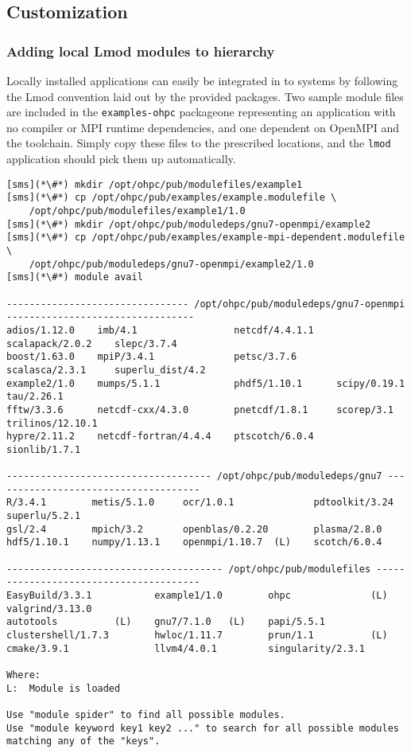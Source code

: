 \clearpage

\subsection{Customization} \label{appendix:customization}

\subsubsection{Adding local Lmod modules to \OHPC{} hierarchy} \label{appendix:modulefiles}
Locally installed applications can easily be integrated in to \OHPC{} systems by
following the Lmod convention laid out by the provided packages. Two sample
module files are included in the \texttt{examples-ohpc} package\textemdash one
representing an application with no compiler or MPI runtime dependencies, and
one dependent on OpenMPI and the \GNU{} toolchain. Simply copy these files to the
prescribed locations, and the \texttt{lmod} application should pick them up
automatically.

\begin{lstlisting}[alsoletter={/,.},morekeywords={example1/1.0, example2/1.0}]
[sms](*\#*) mkdir /opt/ohpc/pub/modulefiles/example1
[sms](*\#*) cp /opt/ohpc/pub/examples/example.modulefile \
    /opt/ohpc/pub/modulefiles/example1/1.0
[sms](*\#*) mkdir /opt/ohpc/pub/moduledeps/gnu7-openmpi/example2
[sms](*\#*) cp /opt/ohpc/pub/examples/example-mpi-dependent.modulefile \
    /opt/ohpc/pub/moduledeps/gnu7-openmpi/example2/1.0
[sms](*\#*) module avail

-------------------------------- /opt/ohpc/pub/moduledeps/gnu7-openmpi ---------------------------------
adios/1.12.0    imb/4.1                 netcdf/4.4.1.1    scalapack/2.0.2    slepc/3.7.4
boost/1.63.0    mpiP/3.4.1              petsc/3.7.6       scalasca/2.3.1     superlu_dist/4.2
example2/1.0    mumps/5.1.1             phdf5/1.10.1      scipy/0.19.1       tau/2.26.1
fftw/3.3.6      netcdf-cxx/4.3.0        pnetcdf/1.8.1     scorep/3.1         trilinos/12.10.1
hypre/2.11.2    netcdf-fortran/4.4.4    ptscotch/6.0.4    sionlib/1.7.1

------------------------------------ /opt/ohpc/pub/moduledeps/gnu7 -------------------------------------
R/3.4.1        metis/5.1.0     ocr/1.0.1              pdtoolkit/3.24    superlu/5.2.1
gsl/2.4        mpich/3.2       openblas/0.2.20        plasma/2.8.0
hdf5/1.10.1    numpy/1.13.1    openmpi/1.10.7  (L)    scotch/6.0.4

-------------------------------------- /opt/ohpc/pub/modulefiles ---------------------------------------
EasyBuild/3.3.1           example1/1.0        ohpc              (L)    valgrind/3.13.0
autotools          (L)    gnu7/7.1.0   (L)    papi/5.5.1
clustershell/1.7.3        hwloc/1.11.7        prun/1.1          (L)
cmake/3.9.1               llvm4/4.0.1         singularity/2.3.1

Where:
L:  Module is loaded

Use "module spider" to find all possible modules.
Use "module keyword key1 key2 ..." to search for all possible modules matching any of the "keys".
\end{lstlisting}

